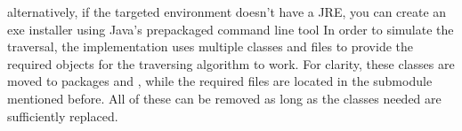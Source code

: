 \markdownRendererUlItem alternatively, if the targeted environment doesn't have a JRE, you can create an exe installer using Java's prepackaged  command line tool\markdownRendererUlItemEnd 
\markdownRendererUlEndTight \markdownRendererOlItemEnd 
\markdownRendererOlEndTight \markdownRendererInterblockSeparator
{}\newpage \shorthandoff{-}\markdownRendererInterblockSeparator
{}
\markdownRendererSectionEnd \markdownRendererSectionBegin
{}\markdownRendererInterblockSeparator
{}In order to simulate the traversal, the implementation uses multiple classes and files to provide the required objects for the traversing algorithm to work. For clarity, these classes are moved to packages  and , while the required files are located in the submodule  mentioned before. All of these can be removed as long as the classes needed are sufficiently replaced. \shorthandon{-}
\markdownRendererSectionEnd 
\markdownRendererSectionEnd \markdownRendererDocumentEnd